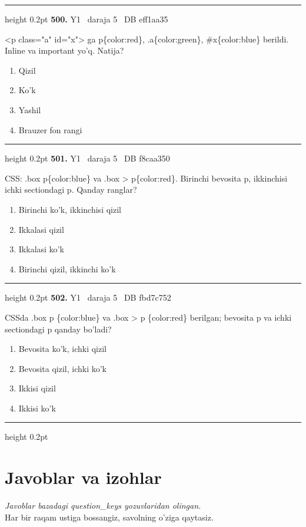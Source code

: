 \documentclass[10pt,a4paper,oneside]{article}
\begin{document}
\vspace{2mm}\hrule height 0.2pt \vspace{4mm}
\hypertarget{q500}{\textbf{\color{ink}500.}}  {\color{muted}\scriptsize Y1 \textbullet\ daraja 5 \textbullet\ DB eff1aa35}
\par
\textless{}p class="a" id="x"\textgreater{} ga p\{color:red\}, .a\{color:green\}, \#x\{color:blue\} berildi. Inline va important yo'q. Natija?
\begin{enumerate}[label=\Alph*),leftmargin=9mm]
\item Qizil
\item Ko'k
\item Yashil
\item Brauzer fon rangi
\end{enumerate}
\vspace{2mm}\hrule height 0.2pt \vspace{4mm}
\hypertarget{q501}{\textbf{\color{ink}501.}}  {\color{muted}\scriptsize Y1 \textbullet\ daraja 5 \textbullet\ DB f8caa350}
\par
CSS: .box p\{color:blue\} va .box \textgreater{} p\{color:red\}. Birinchi bevosita p, ikkinchisi ichki sectiondagi p. Qanday ranglar?
\begin{enumerate}[label=\Alph*),leftmargin=9mm]
\item Birinchi ko'k, ikkinchisi qizil
\item Ikkalasi qizil
\item Ikkalasi ko'k
\item Birinchi qizil, ikkinchi ko'k
\end{enumerate}
\vspace{2mm}\hrule height 0.2pt \vspace{4mm}
\hypertarget{q502}{\textbf{\color{ink}502.}}  {\color{muted}\scriptsize Y1 \textbullet\ daraja 5 \textbullet\ DB fbd7c752}
\par
CSSda .box p \{color:blue\} va .box \textgreater{} p \{color:red\} berilgan; bevosita p va ichki sectiondagi p qanday bo'ladi?
\begin{enumerate}[label=\Alph*),leftmargin=9mm]
\item Bevosita ko'k, ichki qizil
\item Bevosita qizil, ichki ko'k
\item Ikkisi qizil
\item Ikkisi ko'k
\end{enumerate}
\vspace{2mm}\hrule height 0.2pt \vspace{4mm}
\clearpage\section{Javoblar va izohlar}
\textit{Javoblar bazadagi question\_keys yozuvlaridan olingan.}\\
Har bir raqam ustiga bossangiz, savolning o'ziga qaytasiz.
\end{document}
